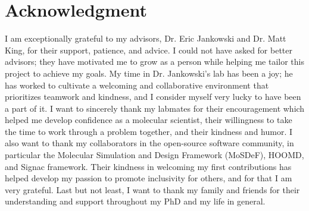 \chapter*{Acknowledgment}

I am exceptionally grateful to my advisors, Dr. Eric Jankowski and Dr. Matt King, for their support, patience, and advice. 
I could not have asked for better advisors; they have motivated me to grow as a person while helping me tailor this project to achieve my goals.
My time in Dr. Jankowski's lab has been a joy; he has worked to cultivate a welcoming and collaborative environment that prioritizes teamwork and kindness, and I consider myself very lucky to have been a part of it.
I want to sincerely thank my labmates for their encouragement which helped me develop confidence as a molecular scientist, their willingness to take the time to work through a problem together, and their kindness and humor.
I also want to thank my collaborators in the open-source software community, in particular the Molecular Simulation and Design Framework (MoSDeF), HOOMD, and Signac framework.
Their kindness in welcoming my first contributions has helped develop my passion to promote inclusivity for others, and for that I am very grateful.
Last but not least, I want to thank my family and friends for their understanding and support throughout my PhD and my life in general.

